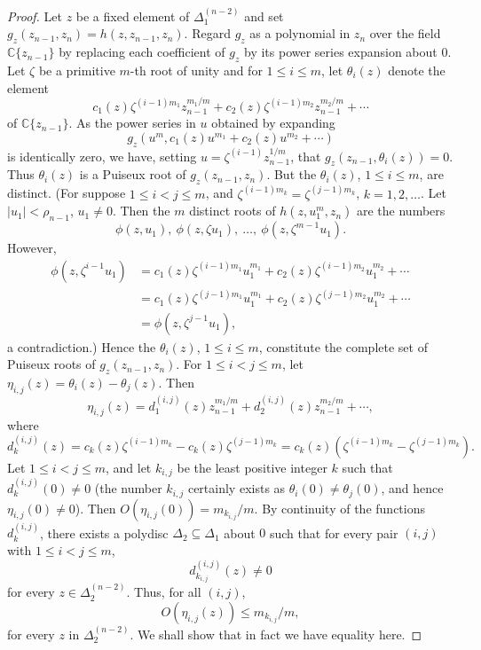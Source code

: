 \documentclass[11pt]{article}
\theoremstyle{plain}
\theoremstyle{definition}
\newcommand{\C}{\mathbb{C}}
\begin{document}
\begin{proof}
Let $z$ be a fixed element of $\Delta_1^{(n-2)}$ and set
$g_z(z_{n-1}, z_n) = h(z, z_{n-1}, z_n)$. Regard $g_z$ as a polynomial
in $z_n$ over the field $\C\{z_{n-1}\}$ by replacing each coefficient
of $g_z$ by its power series expansion about $0$. Let $\zeta$ be a
primitive $m$-th root of unity and for $1 \le i \le m$, let
$\theta_i(z)$ denote the element
\[
c_1(z) \zeta^{(i-1) m_1} z_{n-1}^{m_1/m}
+ c_2(z) \zeta^{(i-1) m_2} z_{n-1}^{m_2/m} + \cdots
\]
of $\C\{z_{n-1}\}$. As the power series in $u$ obtained by expanding
\[
g_z(u^m, c_1(z) u^{m_1} + c_2(z) u^{m_2} + \cdots)
\]
is identically zero, we have, setting
$u = \zeta^{(i-1)} z_{n-1}^{1/m}$, that
$g_z(z_{n-1}, \theta_i(z)) = 0$. Thus $\theta_i(z)$ is a Puiseux root
of $g_z(z_{n-1}, z_n)$. But the $\theta_i(z)$, $1 \le i \le m$, are
distinct. (For suppose $1 \le i < j \le m$, and
$\zeta^{(i-1) m_k} = \zeta^{(j-1) m_k}$, $k = 1, 2, \ldots$. Let
$|u_1| < \rho_{n-1}$, $u_1 \ne 0$. Then the $m$ distinct roots of
$h(z, u_1^m, z_n)$ are the numbers
\[
\phi(z, u_1),\ \phi(z, \zeta u_1),\ \ldots,\ \phi(z, \zeta^{m-1} u_1).
\]
However,
\[
\begin{aligned}
\phi(z, \zeta^{i-1} u_1) &= c_1(z) \zeta^{(i-1) m_1} u_1^{m_1}
+ c_2(z) \zeta^{(i-1) m_2} u_1^{m_2} + \cdots \\
&= c_1(z) \zeta^{(j-1) m_1} u_1^{m_1}
+ c_2(z) \zeta^{(j-1) m_2} u_1^{m_2} + \cdots \\
&= \phi(z, \zeta^{j-1} u_1),
\end{aligned}
\]
a contradiction.) Hence the $\theta_i(z)$, $1 \le i \le m$,
constitute the complete set of Puiseux roots of
$g_z(z_{n-1}, z_n)$. For $1 \le i < j \le m$, let
$\eta_{i, j}(z) = \theta_i(z) - \theta_j(z)$. Then
\[
\eta_{i, j}(z) = d_1^{(i, j)}(z) z_{n-1}^{m_1/m}
+ d_2^{(i, j)}(z) z_{n-1}^{m_2/m} + \cdots,
\]
where
\[
d_k^{(i, j)}(z) = c_k(z) \zeta^{(i-1) m_k} - c_k(z) \zeta^{(j-1) m_k}
= c_k(z) \left( \zeta^{(i-1) m_k} - \zeta^{(j-1) m_k} \right).
\]
Let $1 \le i < j \le m$, and let $k_{i, j}$ be the least positive
integer $k$ such that $d_k^{(i, j)}(0) \ne 0$ (the number
$k_{i, j}$ certainly exists as $\theta_i(0) \ne \theta_j(0)$, and
hence $\eta_{i, j}(0) \ne 0$). Then
$O(\eta_{i, j}(0)) = m_{k_{i, j}} / m$. By continuity of the
functions $d_k^{(i, j)}$, there exists a polydisc
$\Delta_2 \subseteq \Delta_1$ about $0$ such that for every pair
$(i, j)$ with $1 \le i < j \le m$,
\[
d_{k_{i, j}}^{(i, j)}(z) \ne 0
\]
for every $z \in \Delta_2^{(n-2)}$. Thus, for all $(i, j)$,
\[
O(\eta_{i, j}(z)) \le m_{k_{i, j}} / m,
\]
for every $z$ in $\Delta_2^{(n-2)}$. We shall show that in fact we
have equality here.


\end{proof}
\end{document}

